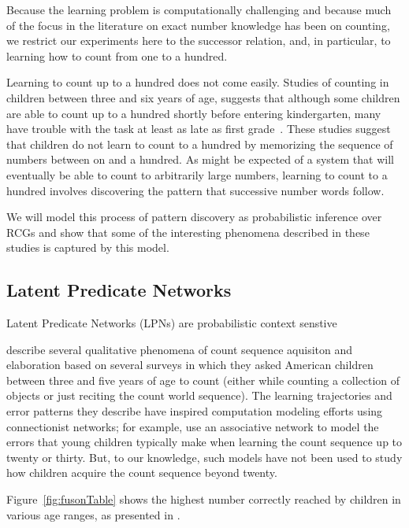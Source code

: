 \documentclass[10pt,letterpaper]{article}
\begin{document}
Because the learning problem is computationally challenging and
because much of the focus in the literature on exact number knowledge
has been on counting, we restrict our experiments here to the
successor relation, and, in particular, to learning how to count from
one to a hundred.

Learning to count up to a hundred does not come easily. Studies of
counting in children between three and six years of age, suggests that
although some children are able to count up to a hundred shortly
before entering kindergarten, many have trouble with the task at least
as late as first
grade~\cite{FusRicBriar1982,miller1987counting}. These studies suggest
that children do not learn to count to a hundred by memorizing the
sequence of numbers between on and a hundred. As might be expected of
a system that will eventually be able to count to arbitrarily large
numbers, learning to count to a hundred involves discovering the
pattern that successive number words follow. 

We will model this process of pattern discovery as probabilistic
inference over RCGs and show that some of the interesting phenomena
described in these studies is captured by this model. 

\subsection{Latent Predicate Networks}
Latent Predicate Networks (LPNs) are probabilistic context senstive

\citet{FusRicBriar1982} describe several qualitative phenomena of
count sequence aquisiton and elaboration based on several surveys in
which they asked American children between three and five years of age
to count (either while counting a collection of objects or just
reciting the count world sequence). The learning trajectories and
error patterns they describe have inspired computation modeling
efforts using connectionist networks; for example,
\citet{ma1989modeling} use an associative network to model the errors
that young children typically make when learning the count sequence up
to twenty or thirty. But, to our knowledge, such models have not been
used to study how children acquire the count sequence beyond twenty.

Figure~\ref{fig:fusonTable} shows the highest number correctly reached
by children in various age ranges, as presented in
\citet{FusRicBriar1982}.
\end{document}
